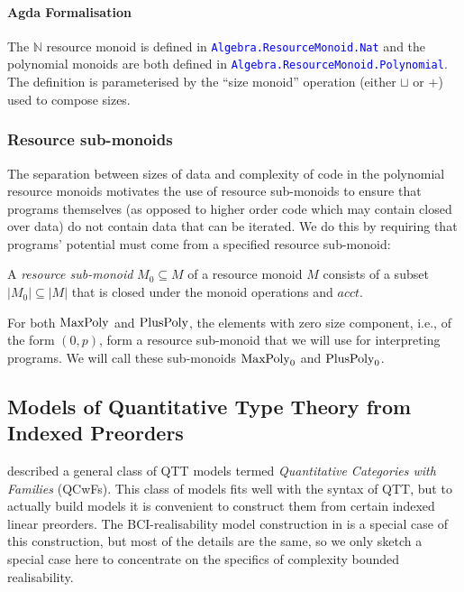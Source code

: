 \documentclass[acmsmall,review,screen,anonymous]{acmart}
\newcommand{\AgdaModule}[1]{\textcolor{blue}{\tt #1}}
\begin{document}
\paragraph{Agda Formalisation} The $\mathbb{N}$ resource monoid is
defined in \AgdaModule{Algebra.ResourceMonoid.Nat} and the polynomial
monoids are both defined in
\AgdaModule{Algebra.ResourceMonoid.Polynomial}. The definition is
parameterised by the ``size monoid'' operation (either $\sqcup$ or
$+$) used to compose sizes.


\subsubsection{Resource sub-monoids}

The separation between sizes of data and complexity of code in the
polynomial resource monoids motivates the use of resource sub-monoids
to ensure that programs themselves (as opposed to higher order code
which may contain closed over data) do not contain data that can be
iterated. We do this by requiring that programs' potential must come
from a specified resource sub-monoid:

\begin{definition}
  A \emph{resource sub-monoid} $M_0 \subseteq M$ of a resource monoid
  $M$ consists of a subset $|M_0| \subseteq |M|$ that is closed under
  the monoid operations and $\mathit{acct}$.
\end{definition}

For both $\mathrm{MaxPoly}$ and $\mathrm{PlusPoly}$, the elements with zero size
component, i.e., of the form $(0,p)$, form a resource sub-monoid that
we will use for interpreting programs. We will call these sub-monoids
$\mathrm{MaxPoly}_0$ and $\mathrm{PlusPoly}_0$.

\subsection{Models of Quantitative Type Theory from Indexed Preorders}
\label{sec:qtt-models}

\cite{atkey18qtt} described a general class of QTT models termed
\emph{Quantitative Categories with Families} (QCwFs). This class of
models fits well with the syntax of QTT, but to actually build models
it is convenient to construct them from certain indexed linear
preorders. The BCI-realisability model construction in
\cite{atkey18qtt} is a special case of this construction, but most of
the details are the same, so we only sketch a special case here to
concentrate on the specifics of complexity bounded realisability.
\end{document}
